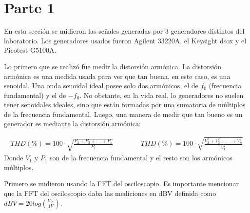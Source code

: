 \section{Parte 1}

En esta sección se midieron las señales generadas por 3 generadores distintos del laboratorio. Los generadores usados fueron Agilent 33220A, el Keysight dsox y el Picotest G5100A.\par

Lo primero que se realizó fue medir la distorsión armónica. La distorsión armónica es una medida usada para ver que tan buena, en este caso, es una senoidal. Una onda senoidal ideal posee solo dos armónicos, el de $f_0$ (frecuencia fundamental) y el de $-f_0$. No obstante, en la vida real, lo generadores no suelen tener senoidales ideales, sino que están formadas por una sumatoria de múltiplos de la frecuencia fundamental. Luego, una manera de medir que tan bueno es un generador es mediante la distorsión armónica:

\begin{equation*}
\begin{aligned}
THD (\%) = 100 \cdot \sqrt{\frac{P_2+P_3+....+P_n}{P_1}} 
\qquad\qquad
THD (\%) = 100 \cdot \sqrt{\frac{V_2^2+V_3^2+....+V_n^2}{V_1^2}} 
\end{aligned}
\label{eq:distorsionarmonica}
\end{equation*}
Donde $V_1$ y $P_1$ son de la frecuencia fundamental y el resto son los armónicos múltiplos.\par


Primero se midieron usando la FFT del osciloscopio. Es importante mencionar que la FFT del osciloscopio daba las mediciones en dBV definida como $dBV = 20log(\frac{V_{in}}{1V})$. 


